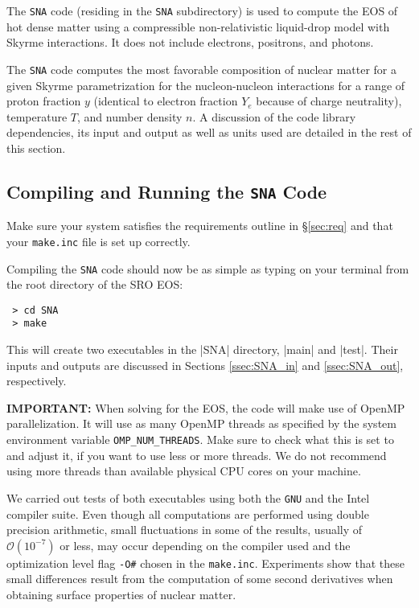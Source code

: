 \documentclass[letterpaper,11pt]{refart}
\begin{document}
The \texttt{SNA} code (residing in the \texttt{SNA} subdirectory) is
used to compute the EOS of hot dense matter using a compressible
non-relativistic liquid-drop model with Skyrme interactions. It does
not include electrons, positrons, and photons.

The \texttt{SNA} code computes the most favorable composition of
nuclear matter for a given Skyrme parametrization for the
nucleon-nucleon interactions for a range of proton fraction $y$
(identical to electron fraction $Y_e$ because of charge neutrality),
temperature $T$, and number density $n$. A discussion of the code
library dependencies, its input and output as well as units used are
detailed in the rest of this section.


\subsection{Compiling and Running the \texttt{SNA} Code}\label{ssec:SNA_dep}

Make sure your system satisfies the requirements outline in
\S\ref{sec:req} and that your \texttt{make.inc} file is set up
correctly.

Compiling the \verb|SNA| code should now be as simple as typing on
your terminal from the root directory of the SRO EOS:

\begin{verbatim}
 > cd SNA
 > make
\end{verbatim}


This will create two executables in the \verbfile|SNA| directory,
\verbexec|main| and \verbexec|test|.  Their inputs and outputs are
discussed in Sections \ref{ssec:SNA_in} and \ref{ssec:SNA_out},
respectively.

\textbf{IMPORTANT:} When solving for the EOS, the code will make use
of OpenMP parallelization. It will use as many OpenMP threads as
specified by the system environment variable
\texttt{OMP\_NUM\_THREADS}. Make sure to check what this is set to and
adjust it, if you want to use less or more threads. We do not
recommend using more threads than available physical CPU cores on your
machine.



We carried out tests of both executables using both the \texttt{GNU}
and the Intel compiler suite.  Even though all computations are
performed using double precision arithmetic, small fluctuations in
some of the results, usually of $\mathcal{O}(10^{-7})$ or less, may
occur depending on the compiler used and the optimization level flag
\verb|-O#| chosen in the \texttt{make.inc}. Experiments show that
these small differences result from the computation of some second
derivatives when obtaining surface properties of nuclear matter.
\end{document}
